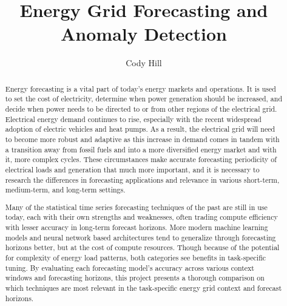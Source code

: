 \documentclass[sigconf]{acmart}
\begin{document}
\title{Energy Grid Forecasting and Anomaly Detection}


\author{Cody Hill}


\renewcommand{\shortauthors}{C. Hill}

\begin{abstract}
Energy forecasting is a vital part of today's energy markets and operations. It is used to set the cost of electricity, determine when power generation should be increased, and decide when power needs to be directed to or from other regions of the electrical grid. Electrical energy demand continues to rise, especially with the recent widespread adoption of electric vehicles and heat pumps. As a result, the electrical grid will need to become more robust and adaptive as this increase in demand comes in tandem with a transition away from fossil fuels and into a more diversified energy market  and with it, more complex cycles. These circumstances make accurate forecasting periodicity of electrical loads and generation that much more important, and it is necessary to research the differences in forecasting applications and relevance in various short-term, medium-term, and long-term settings.

Many of the statistical time series forecasting techniques of the past are still in use today, each with their own strengths and weaknesses, often trading compute efficiency with lesser accuracy in long-term forecast horizons. More modern machine learning models and neural network based architectures tend to generalize through forecasting horizons better, but at the cost of compute resources. Though because of the potential for complexity of energy load patterns, both categories see benefits in task-specific tuning. By evaluating each forecasting model's accuracy across various context windows and forecasting horizons, this project presents a thorough comparison on which techniques are most relevant in the task-specific energy grid context and forecast horizons.
\end{abstract}
\end{document}
